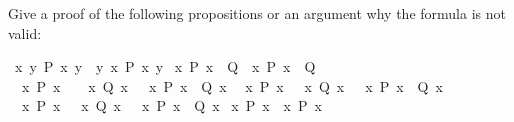 \begin{isabellebody}
\begin{isamarkuptext}
Give a proof of the following propositions or an argument why the formula is not valid:%
\end{isamarkuptext}%
\isamarkuptrue%
\ {\isachardoublequote}{\isacharparenleft}{\isasymexists}x{\isachardot}\ {\isasymforall}y{\isachardot}\ P\ x\ y{\isacharparenright}\ {\isasymlongrightarrow}\ {\isacharparenleft}{\isasymforall}y{\isachardot}\ {\isasymexists}x{\isachardot}\ P\ x\ y{\isacharparenright}{\isachardoublequote}\isamarkupfalse%
\isanewline
\isamarkupfalse%
\ {\isachardoublequote}{\isacharparenleft}{\isasymforall}x{\isachardot}\ P\ x\ {\isasymlongrightarrow}\ Q{\isacharparenright}\ {\isacharequal}\ {\isacharparenleft}{\isacharparenleft}{\isasymexists}x{\isachardot}\ P\ x{\isacharparenright}\ {\isasymlongrightarrow}\ Q{\isacharparenright}{\isachardoublequote}\isamarkupfalse%
\isanewline
\isamarkupfalse%
\ {\isachardoublequote}{\isacharparenleft}{\isacharparenleft}{\isasymforall}\ x{\isachardot}\ P\ x{\isacharparenright}\ \ {\isasymand}\ {\isacharparenleft}{\isasymforall}\ x{\isachardot}\ Q\ x{\isacharparenright}{\isacharparenright}\ {\isacharequal}\ {\isacharparenleft}{\isasymforall}\ x{\isachardot}\ {\isacharparenleft}P\ x\ {\isasymand}\ Q\ x{\isacharparenright}{\isacharparenright}{\isachardoublequote}\isamarkupfalse%
\isanewline
\isamarkupfalse%
\ {\isachardoublequote}{\isacharparenleft}{\isacharparenleft}{\isasymforall}\ x{\isachardot}\ P\ x{\isacharparenright}\ {\isasymor}\ {\isacharparenleft}{\isasymforall}\ x{\isachardot}\ Q\ x{\isacharparenright}{\isacharparenright}\ {\isacharequal}\ {\isacharparenleft}{\isasymforall}\ x{\isachardot}\ {\isacharparenleft}P\ x\ {\isasymor}\ Q\ x{\isacharparenright}{\isacharparenright}{\isachardoublequote}\isamarkupfalse%
\isanewline
\isamarkupfalse%
\ {\isachardoublequote}{\isacharparenleft}{\isacharparenleft}{\isasymexists}\ x{\isachardot}\ P\ x{\isacharparenright}\ {\isasymor}\ {\isacharparenleft}{\isasymexists}\ x{\isachardot}\ Q\ x{\isacharparenright}{\isacharparenright}\ {\isacharequal}\ {\isacharparenleft}{\isasymexists}\ x{\isachardot}\ {\isacharparenleft}P\ x\ {\isasymor}\ Q\ x{\isacharparenright}{\isacharparenright}{\isachardoublequote}\isamarkupfalse%
\isanewline
\isamarkupfalse%
\ {\isachardoublequote}{\isasymexists}x{\isachardot}\ {\isacharparenleft}P\ x\ {\isasymlongrightarrow}\ {\isacharparenleft}{\isasymforall}x{\isachardot}\ P\ x{\isacharparenright}{\isacharparenright}{\isachardoublequote}\isamarkupfalse%
\isamarkupfalse%
%
\end{isabellebody}
